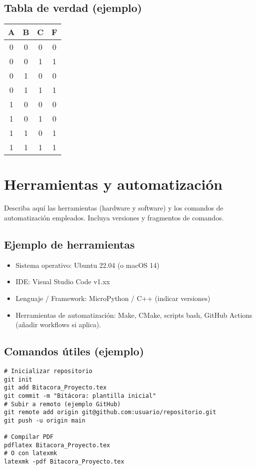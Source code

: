 \documentclass[12pt,a4paper]{article}
\begin{document}
\subsection*{Tabla de verdad (ejemplo)}
\begin{center}
\begin{tabular}{cccc}
\toprule
A & B & C & F \\
\midrule
0 & 0 & 0 & 0 \\
0 & 0 & 1 & 1 \\
0 & 1 & 0 & 0 \\
0 & 1 & 1 & 1 \\
1 & 0 & 0 & 0 \\
1 & 0 & 1 & 0 \\
1 & 1 & 0 & 1 \\
1 & 1 & 1 & 1 \\
\bottomrule
\end{tabular}
\end{center}

\section{Herramientas y automatización}
Describa aquí las herramientas (hardware y software) y los comandos de automatización empleados. Incluya versiones y fragmentos de comandos.

\subsection*{Ejemplo de herramientas}
\begin{itemize}
  \item Sistema operativo: Ubuntu 22.04 (o macOS 14)
  \item IDE: Visual Studio Code v1.xx
  \item Lenguaje / Framework: MicroPython / C++ (indicar versiones)
  \item Herramientas de automatización: Make, CMake, scripts bash, GitHub Actions (añadir workflows si aplica).
\end{itemize}

\subsection*{Comandos útiles (ejemplo)}
\begin{lstlisting}
# Inicializar repositorio
git init
git add Bitacora_Proyecto.tex
git commit -m "Bitácora: plantilla inicial"
# Subir a remoto (ejemplo GitHub)
git remote add origin git@github.com:usuario/repositorio.git
git push -u origin main

# Compilar PDF
pdflatex Bitacora_Proyecto.tex
# O con latexmk
latexmk -pdf Bitacora_Proyecto.tex
\end{lstlisting}
\end{document}
